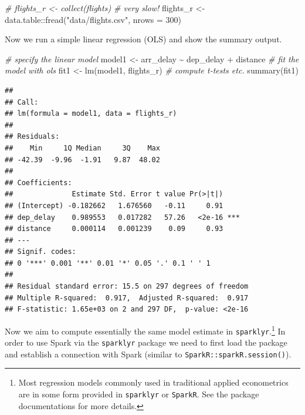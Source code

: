 \documentclass[
  12pt,
]{style/krantz}
\newenvironment{Shaded}{\begin{snugshade}}{\end{snugshade}}
\newcommand{\AttributeTok}[1]{\textcolor[rgb]{0.77,0.63,0.00}{#1}}
\newcommand{\CommentTok}[1]{\textcolor[rgb]{0.56,0.35,0.01}{\textit{#1}}}
\newcommand{\DecValTok}[1]{\textcolor[rgb]{0.00,0.00,0.81}{#1}}
\newcommand{\FunctionTok}[1]{\textcolor[rgb]{0.00,0.00,0.00}{#1}}
\newcommand{\NormalTok}[1]{#1}
\newcommand{\OtherTok}[1]{\textcolor[rgb]{0.56,0.35,0.01}{#1}}
\newcommand{\SpecialCharTok}[1]{\textcolor[rgb]{0.00,0.00,0.00}{#1}}
\newcommand{\StringTok}[1]{\textcolor[rgb]{0.31,0.60,0.02}{#1}}
\begin{document}
\begin{Shaded}
\begin{Highlighting}[]
\CommentTok{\# flights\_r \textless{}{-} collect(flights) \# very slow!}
\NormalTok{flights\_r }\OtherTok{\textless{}{-}}\NormalTok{ data.table}\SpecialCharTok{::}\FunctionTok{fread}\NormalTok{(}\StringTok{"data/flights.csv"}\NormalTok{, }\AttributeTok{nrows =} \DecValTok{300}\NormalTok{) }
\end{Highlighting}
\end{Shaded}

Now we run a simple linear regression (OLS) and show the summary output.

\begin{Shaded}
\begin{Highlighting}[]
\CommentTok{\# specify the linear model}
\NormalTok{model1 }\OtherTok{\textless{}{-}}\NormalTok{ arr\_delay }\SpecialCharTok{\textasciitilde{}}\NormalTok{ dep\_delay }\SpecialCharTok{+}\NormalTok{ distance}
\CommentTok{\# fit the model with ols}
\NormalTok{fit1 }\OtherTok{\textless{}{-}} \FunctionTok{lm}\NormalTok{(model1, flights\_r)}
\CommentTok{\# compute t{-}tests etc.}
\FunctionTok{summary}\NormalTok{(fit1)}
\end{Highlighting}
\end{Shaded}

\begin{verbatim}
## 
## Call:
## lm(formula = model1, data = flights_r)
## 
## Residuals:
##    Min     1Q Median     3Q    Max 
## -42.39  -9.96  -1.91   9.87  48.02 
## 
## Coefficients:
##              Estimate Std. Error t value Pr(>|t|)    
## (Intercept) -0.182662   1.676560   -0.11     0.91    
## dep_delay    0.989553   0.017282   57.26   <2e-16 ***
## distance     0.000114   0.001239    0.09     0.93    
## ---
## Signif. codes:  
## 0 '***' 0.001 '**' 0.01 '*' 0.05 '.' 0.1 ' ' 1
## 
## Residual standard error: 15.5 on 297 degrees of freedom
## Multiple R-squared:  0.917,  Adjusted R-squared:  0.917 
## F-statistic: 1.65e+03 on 2 and 297 DF,  p-value: <2e-16
\end{verbatim}

Now we aim to compute essentially the same model estimate in \texttt{sparklyr}.\footnote{Most regression models commonly used in traditional applied econometrics are in some form provided in \texttt{sparklyr} or \texttt{SparkR}. See the package documentations for more details.} In order to use Spark via the \texttt{sparklyr} package we need to first load the package and establish a connection with Spark (similar to \texttt{SparkR::sparkR.session()}).
\end{document}
